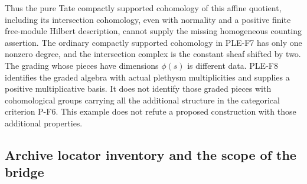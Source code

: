 \documentclass[11pt,a4paper]{article}
\begin{document}
Thus the pure Tate compactly supported cohomology of this affine
quotient, including its intersection cohomology, even with normality
and a positive finite free-module Hilbert description, cannot supply
the missing homogeneous counting assertion.
The ordinary compactly supported cohomology in PLE-F7 has only one
nonzero degree, and the intersection complex is the constant sheaf
shifted by two. The grading whose pieces have dimensions $\phi(s)$ is
different data. PLE-F8 identifies the graded algebra with actual
plethysm multiplicities and supplies a positive multiplicative basis.
It does not identify those graded pieces with cohomological groups
carrying all the additional structure in the categorical criterion
P-F6. This example does not refute a proposed construction with
those additional properties.

\subsection{Archive locator inventory and the scope of the bridge}
\end{document}

